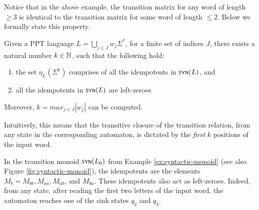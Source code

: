 Notice that in the above example, the transition matrix for any word of length $\geq 3$ is identical to the transition matrix for some word of length $\leq 2$. Below we formally state this property.
\begin{lemma}\label{lem:almeida}\emph{\cite[\S 3.7.2]{almeida1995finite}}
	Given a PPT language $L = \bigcup_{j\in J} w_j\Sigma^*$, for a finite set of indices $J$, there exists a natural number $k\in\mathbb{N}$, such that the following hold:
	\begin{enumerate}
		\item the set $\eta_L(\Sigma^k)$ comprises of all the idempotents in $\scrsf{syn}(L)$, and
		\item  all the idempotents in $\scrsf{syn}(L)$ are left-zeroes
	\end{enumerate}
	Moreover, $k = max_{j\in J} |w_j|$ can be computed.
\end{lemma}
Intuitively, this means that the transitive closure of the transition relation, from any state in the corresponding automaton, is dictated by the \emph{first} $k$ positions of the input word.
\begin{example}
	In the transition monoid $\synmon{L_0}$ from Example \ref{ex:syntactic-monoid} (see also Figure \ref{fig:syntactic-monoid}), the idempotents are the elements $M_b = M_{bb},M_{aa},M_{ab}$, and $M_{ba}$. These idempotents also act as left-zeroes. Indeed, from any state, after reading the first two letters of the input word, the automaton reaches one of the sink states $q_2$ and $q_3$.
\end{example}

